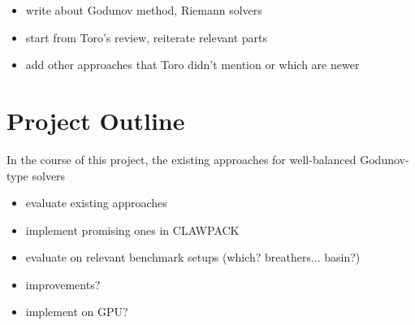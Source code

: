 \documentclass[a4paper,onecolumn,11pt]{article}
\begin{document}
\begin{assignment}
\begin{itemize}
    \item write about Godunov method, Riemann solvers
    \item start from Toro's review, reiterate relevant parts
    \item add other approaches that Toro didn't mention or which are newer
\end{itemize}

\section*{Project Outline}

In the course of this project, the existing approaches for well-balanced Godunov-type solvers

\begin{itemize}
    \item evaluate existing approaches
    \item implement promising ones in CLAWPACK
    \item evaluate on relevant benchmark setups (which? breathers... basin?)
    \item improvements?
    \item implement on GPU?
\end{itemize}

\end{assignment}



\end{document}
